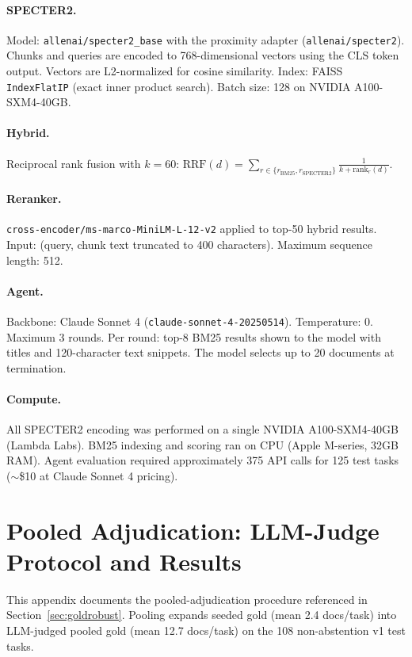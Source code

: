 \documentclass{article}
\begin{document}
\paragraph{SPECTER2.} Model: \texttt{allenai/specter2\_base} with the proximity adapter (\texttt{allenai/specter2}). Chunks and queries are encoded to 768-dimensional vectors using the CLS token output. Vectors are L2-normalized for cosine similarity. Index: FAISS \texttt{IndexFlatIP} (exact inner product search). Batch size: 128 on NVIDIA A100-SXM4-40GB.

\paragraph{Hybrid.} Reciprocal rank fusion with $k{=}60$: $\text{RRF}(d) = \sum_{r \in \{r_{\text{BM25}}, r_{\text{SPECTER2}}\}} \frac{1}{k + \text{rank}_r(d)}$.

\paragraph{Reranker.} \texttt{cross-encoder/ms-marco-MiniLM-L-12-v2} applied to top-50 hybrid results. Input: (query, chunk text truncated to 400 characters). Maximum sequence length: 512.

\paragraph{Agent.} Backbone: Claude Sonnet 4 (\texttt{claude-sonnet-4-20250514}). Temperature: 0. Maximum 3 rounds. Per round: top-8 BM25 results shown to the model with titles and 120-character text snippets. The model selects up to 20 documents at termination.

\paragraph{Compute.} All SPECTER2 encoding was performed on a single NVIDIA A100-SXM4-40GB (Lambda Labs). BM25 indexing and scoring ran on CPU (Apple M-series, 32GB RAM). Agent evaluation required approximately 375 API calls for 125 test tasks (${\sim}$\$10 at Claude Sonnet 4 pricing).

\section{Pooled Adjudication: LLM-Judge Protocol and Results}
\label{app:pooling}

This appendix documents the pooled-adjudication procedure referenced in Section~\ref{sec:goldrobust}. Pooling expands seeded gold (mean 2.4 docs/task) into LLM-judged pooled gold (mean 12.7 docs/task) on the 108 non-abstention v1 test tasks.
\end{document}
